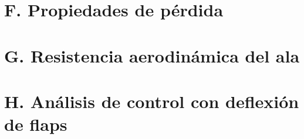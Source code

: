 \section*{F. Propiedades de pérdida}
\vspace*{-5mm}


\section*{G. Resistencia aerodinámica del ala}
\vspace*{-5mm}


\section*{H. Análisis de control con deflexión de flaps}
\vspace*{-5mm}



